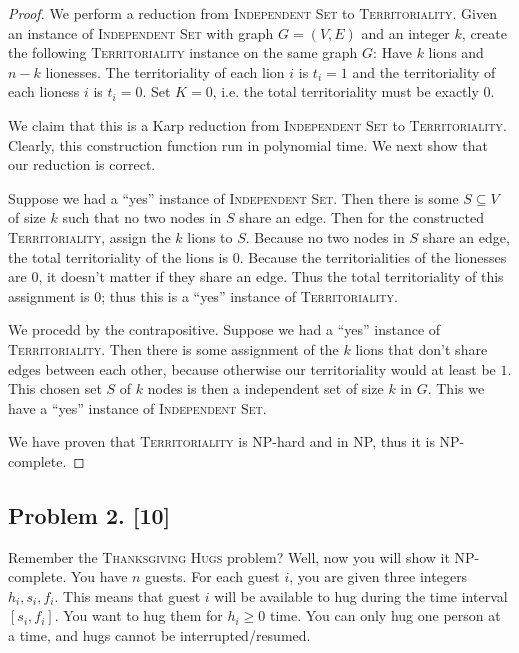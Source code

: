 \documentclass[10pt]{article}
\begin{document}
\begin{proof}
  We perform a reduction from \textsc{Independent Set} to \textsc{Territoriality}. Given an instance of \textsc{Independent Set} with graph \(G = (V, E)\) and an integer \(k\), create the following \textsc{Territoriality} instance on the same graph \(G\): Have \(k\) lions and \(n - k\) lionesses. The territoriality of each lion \(i\) is \(t_i = 1\) and the territoriality of each lioness \(i\) is \(t_i = 0\). Set \(K = 0\), i.e. the total territoriality must be exactly \(0\). 
  
  We claim that this is a Karp reduction from \textsc{Independent Set} to \textsc{Territoriality}. Clearly, this construction function run in polynomial time. We next show that our reduction is correct.
  
  Suppose we had a ``yes'' instance of \textsc{Independent Set}. Then there is some \(S \subseteq V\) of size \(k\) such that no two nodes in \(S\) share an edge. Then for the constructed \textsc{Territoriality}, assign the \(k\) lions to \(S\). Because no two nodes in \(S\) share an edge, the total territoriality of the lions is \(0\). Because the territorialities of the lionesses are \(0\), it doesn't matter if they share an edge. Thus the total territoriality of this assignment is 0; thus this is a ``yes'' instance of \textsc{Territoriality}.

  We procedd by the contrapositive. Suppose we had a ``yes'' instance of \textsc{Territoriality}. Then there is some assignment of the \(k\) lions that don't share edges between each other, because otherwise our territoriality would at least be \(1\). This chosen set \(S\) of \(k\) nodes is then a independent set of size \(k\) in \(G\). This we have a ``yes'' instance of \textsc{Independent Set}.

  We have proven that \textsc{Territoriality} is NP-hard and in NP, thus it is NP-complete.
\end{proof}

\subsection*{Problem 2. [10]}
  Remember the \textsc{Thanksgiving Hugs} problem? Well, now you will show it NP-complete. You have $n$ guests. For each guest $i$, you are given three integers $h_i, s_i, f_i$. This means that guest $i$ will be available to hug during the time interval $[s_i, f_i]$. You want to hug them for $h_i \geq 0$ time. You can only hug one person at a time, and hugs cannot be interrupted/resumed.
\end{document}
